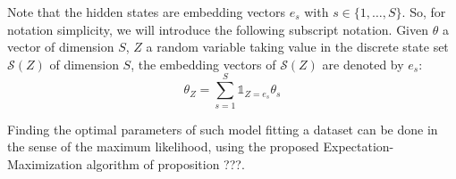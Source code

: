 Note that the hidden states are embedding vectors $e_s$ with $s \in \{1, \dots, S\}$.
So, for notation simplicity, we will introduce the following subscript notation.
Given $\theta$ a vector of dimension $S$, $Z$ a random variable taking value in the discrete state set $\mathcal{S}(Z)$ of dimension $S$, the embedding vectors of $\mathcal{S}(Z)$ are denoted by $e_s$:
$$
\theta_{Z} = \sum_{s=1}^{S} \mathds{1}_{Z=e_s} \theta_{s}
$$

Finding the optimal parameters of such model fitting a dataset can be done in the sense of the maximum likelihood, using the proposed Expectation-Maximization algorithm
of proposition ???.